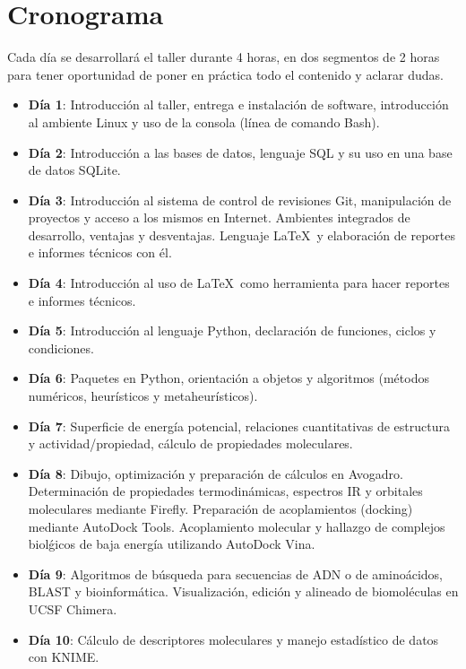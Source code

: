 \documentclass[10pt,letterpaper]{article}
\begin{document}
\section{Cronograma}
Cada d\'ia se desarrollar\'a el taller durante 4 horas, en dos segmentos de 2 horas para tener oportunidad de poner en pr\'actica todo el contenido y aclarar dudas.

\begin{itemize}
\item \textbf{D\'ia 1}: Introducci\'on al taller, entrega e instalaci\'on de software, introducci\'on al ambiente Linux y uso de la consola (l\'inea de comando Bash).
\item \textbf{D\'ia 2}: Introducci\'on a las bases de datos, lenguaje SQL y su uso en una base de datos SQLite.
\item \textbf{D\'ia 3}: Introducci\'on al sistema de control de revisiones Git, manipulaci\'on de proyectos y acceso a los mismos en Internet. Ambientes integrados de desarrollo, ventajas y desventajas. Lenguaje \LaTeX\ y elaboraci\'on de reportes e informes t\'ecnicos con \'el.
\item \textbf{D\'ia 4}: Introducci\'on al uso de \LaTeX\ como herramienta para hacer reportes e informes t\'ecnicos.
\item \textbf{D\'ia 5}: Introducci\'on al lenguaje Python, declaraci\'on de funciones, ciclos y condiciones.
\item \textbf{D\'ia 6}: Paquetes en Python, orientaci\'on a objetos y algoritmos (m\'etodos num\'ericos, heur\'isticos y metaheur\'isticos).
\item \textbf{D\'ia 7}: Superficie de energ\'ia potencial, relaciones cuantitativas de estructura y actividad/propiedad, c\'alculo de propiedades moleculares.
\item \textbf{D\'ia 8}: Dibujo, optimizaci\'on y preparaci\'on de c\'alculos en Avogadro. Determinaci\'on de propiedades termodin\'amicas, espectros IR y orbitales moleculares mediante Firefly. Preparaci\'on de acoplamientos (docking) mediante AutoDock Tools. Acoplamiento molecular y hallazgo de complejos biol\'gicos de baja energ\'ia utilizando AutoDock Vina.
\item \textbf{D\'ia 9}: Algoritmos de b\'usqueda para secuencias de ADN o de amino\'acidos, BLAST y bioinform\'atica. Visualizaci\'on, edici\'on y alineado de biomol\'eculas en UCSF Chimera.
\item \textbf{D\'ia 10}: C\'alculo de descriptores moleculares y manejo estad\'istico de datos con KNIME.
\end{itemize}
\end{document}
